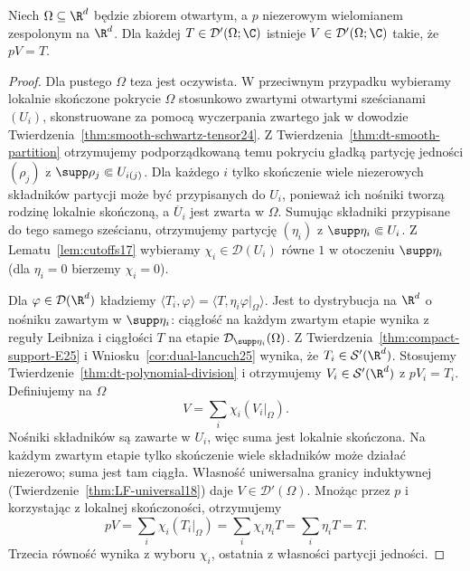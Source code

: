 \begin{wniosek}
\label{cor:dt-polynomial-division-open}
Niech $\Omega\subseteq\R^d$ będzie zbiorem otwartym,
a $p$ niezerowym wielomianem zespolonym na $\R^d$.
Dla każdej $T\in\mathcal D'(\Omega;\C)$ istnieje
$V\in\mathcal D'(\Omega;\C)$ takie, że $pV=T$.
\end{wniosek}
\begin{proof}
Dla pustego $\Omega$ teza jest oczywista.
W przeciwnym przypadku wybieramy lokalnie skończone
pokrycie $\Omega$ stosunkowo zwartymi otwartymi
sześcianami $(U_i)$, skonstruowane za pomocą
wyczerpania zwartego jak w dowodzie
Twierdzenia~\ref{thm:smooth-schwartz-tensor24}.
Z Twierdzenia~\ref{thm:dt-smooth-partition}
otrzymujemy podporządkowaną temu pokryciu
gładką partycję jedności $(\rho_j)$ z
$\supp\rho_j\Subset U_{i(j)}$.
Dla każdego $i$ tylko skończenie wiele niezerowych
składników partycji może być przypisanych do $U_i$,
ponieważ ich nośniki tworzą rodzinę lokalnie
skończoną, a $\overline U_i$ jest zwarta w $\Omega$.
Sumując składniki przypisane do tego samego
sześcianu, otrzymujemy partycję $(\eta_i)$
z $\supp\eta_i\Subset U_i$.
Z Lematu~\ref{lem:cutoffs17} wybieramy
$\chi_i\in\mathcal D(U_i)$ równe $1$ w otoczeniu
$\supp\eta_i$ (dla $\eta_i=0$ bierzemy $\chi_i=0$).

Dla $\varphi\in\mathcal D(\R^d)$ kładziemy
$\langle T_i,\varphi\rangle
=\langle T,\eta_i\varphi|_\Omega\rangle$.
Jest to dystrybucja na $\R^d$ o nośniku zawartym
w $\supp\eta_i$: ciągłość na każdym zwartym etapie
wynika z reguły Leibniza i ciągłości $T$ na etapie
$\mathcal D_{\supp\eta_i}(\Omega)$.
Z Twierdzenia~\ref{thm:compact-support-E25}
i Wniosku~\ref{cor:dual-lancuch25}
wynika, że $T_i\in\mathcal S'(\R^d)$.
Stosujemy Twierdzenie~\ref{thm:dt-polynomial-division}
i otrzymujemy $V_i\in\mathcal S'(\R^d)$ z $pV_i=T_i$.
Definiujemy na $\Omega$
\[
 V=\sum_i\chi_i(V_i|_\Omega).
\]
Nośniki składników są zawarte w $U_i$, więc suma
jest lokalnie skończona. Na każdym zwartym etapie
tylko skończenie wiele składników może działać
niezerowo; suma jest tam ciągła.
Własność uniwersalna granicy induktywnej
(Twierdzenie~\ref{thm:LF-universal18})
daje $V\in\mathcal D'(\Omega)$.
Mnożąc przez $p$ i korzystając z lokalnej skończoności,
otrzymujemy
\[
 pV=\sum_i\chi_i(T_i|_\Omega)
 =\sum_i\chi_i\eta_i T
 =\sum_i\eta_i T=T.
\]
Trzecia równość wynika z wyboru $\chi_i$,
ostatnia z własności partycji jedności.
\end{proof}

